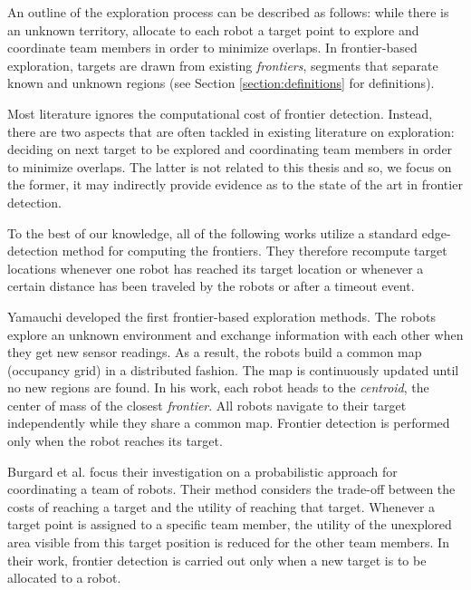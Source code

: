 An outline of the exploration process can be described as follows: while there
is an unknown territory, allocate to each robot a target point to explore and
coordinate team members in order to minimize overlaps. In frontier-based exploration,
targets are drawn from existing \emph{frontiers}, segments that separate known
and unknown regions (see Section \ref{section:definitions} for definitions).

Most literature ignores the computational cost of frontier detection. 
Instead, there are two aspects that are often tackled in existing literature on
exploration: deciding on next target to be explored and coordinating team
members in order to minimize overlaps. The latter is not related to this thesis
and so, we focus on the former, it may indirectly provide
evidence as to the state of the art in frontier detection.

To the best of our knowledge, all of the following works utilize a standard
edge-detection method for computing the frontiers. They therefore recompute
target locations whenever one robot has reached its target location or whenever
a certain distance has been traveled by the robots or after a timeout event.

Yamauchi \cite{yamauchi_frontier-based_1997,yamauchi_frontier-based_1998}
developed the first frontier-based exploration methods. The robots explore an
unknown environment and exchange information with each other when they get new
sensor readings. As a result, the robots build a common map (occupancy grid) in
a distributed fashion. The map is continuously updated until no new regions are
found. In his work, each robot heads to the \emph{centroid}, the center of mass
of the closest \emph{frontier}. All robots navigate to their target
independently while they share a common map. Frontier detection is performed
only when the robot reaches its target.

Burgard et al. \cite{burgard_collaborative_2000,burgard05tro} focus their
investigation on a probabilistic approach for coordinating a team of robots.
Their method considers the trade-off between the costs of reaching a target and the
utility of reaching that target. Whenever a target point is assigned to a
specific team member, the utility of the unexplored area visible from this
target position is reduced for the other team members. In their work, frontier
detection is carried out only when a new target is to be allocated to a robot.

